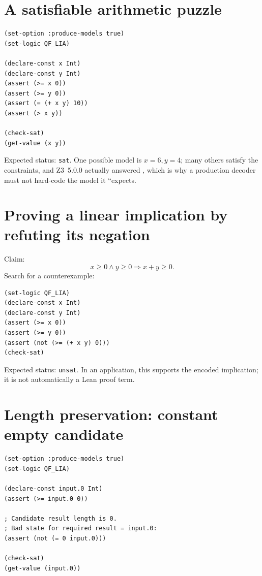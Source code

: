 \documentclass[10pt,letterpaper,oneside]{report}
\newcommand{\code}[1]{\texttt{\detokenize{#1}}}
\newcommand{\sat}{\texttt{sat}}
\newcommand{\unsat}{\texttt{unsat}}
\begin{document}
\section{A satisfiable arithmetic puzzle}

\begin{lstlisting}[language=SMTLib,caption={Find two nonnegative integers with a given sum.}]
(set-option :produce-models true)
(set-logic QF_LIA)

(declare-const x Int)
(declare-const y Int)
(assert (>= x 0))
(assert (>= y 0))
(assert (= (+ x y) 10))
(assert (> x y))

(check-sat)
(get-value (x y))
\end{lstlisting}

Expected status: \sat. One possible model is $x=6,y=4$; many others satisfy the constraints, and Z3~5.0.0 actually answered \code{((x 10) (y 0))}, which is why a production decoder must not hard-code the model it ``expects.

\section{Proving a linear implication by refuting its negation}

Claim:
\[
  x\ge0\land y\ge0\Rightarrow x+y\ge0.
\]
Search for a counterexample:

\begin{lstlisting}[language=SMTLib]
(set-logic QF_LIA)
(declare-const x Int)
(declare-const y Int)
(assert (>= x 0))
(assert (>= y 0))
(assert (not (>= (+ x y) 0)))
(check-sat)
\end{lstlisting}

Expected status: \unsat. In an application, this supports the encoded implication; it is not automatically a Lean proof term.

\section{Length preservation: constant empty candidate}

\begin{lstlisting}[language=SMTLib]
(set-option :produce-models true)
(set-logic QF_LIA)

(declare-const input.0 Int)
(assert (>= input.0 0))

; Candidate result length is 0.
; Bad state for required result = input.0:
(assert (not (= 0 input.0)))

(check-sat)
(get-value (input.0))
\end{lstlisting}
\end{document}
